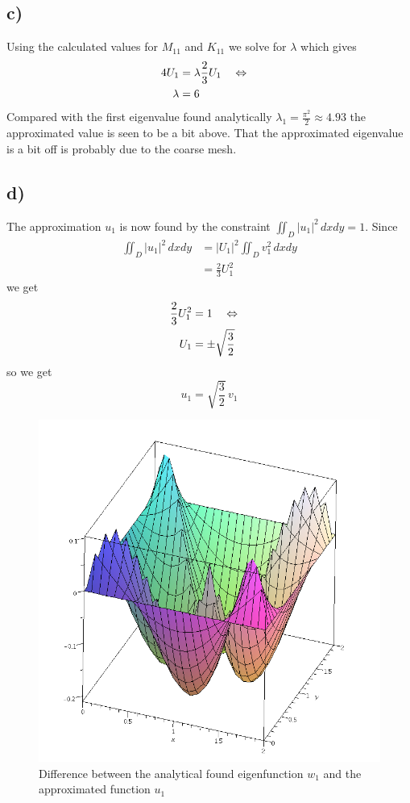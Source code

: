     \subsection*{c)}

    Using the calculated values for $M_{11}$ and $K_{11}$ we solve for $\lambda$ which gives
    \begin{align*}
        4 U_1 &= \lambda \frac{2}{3}U_1 \quad\Leftrightarrow\quad\\
        \lambda &= 6
    \end{align*}
    Compared with the first eigenvalue found analytically $\lambda_1=\frac{\pi^2}{2}\approx 4.93$ the approximated value is seen to be a bit above. That the approximated eigenvalue is a bit off is probably due to the coarse mesh.

    \subsection*{d)}

    The approximation $u_1$ is now found by the constraint $\iint_D |u_1|^2\, dxdy = 1$. Since
    \begin{align*}
        \iint_D |u_1|^2\, dxdy &= |U_1|^2\iint_D v_1^2\, dxdy \\
        &= \frac{2}{3}U_1^2 
    \end{align*}
    we get
    \begin{align*}
        \frac{2}{3}U_1^2 &= 1 \quad\Leftrightarrow\quad \\
        U_1 &= \pm \sqrt{\frac{3}{2}}
    \end{align*}
    so we get 
    \begin{equation*}
        u_1 = \sqrt{\frac{3}{2}}\,v_1
    \end{equation*}

    \begin{figure}[ht]
        \centering
        \includegraphics[width=120mm]{diff-fem.png}
        \caption{Difference between the analytical found eigenfunction $w_1$ and the approximated function $u_1$}
        \label{fig:diff-fem}
    \end{figure}



